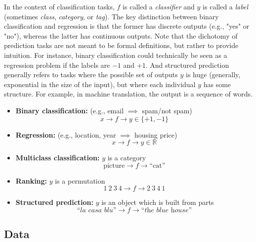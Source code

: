In the context of classification tasks, $f$ is called a \textit{classifier} and $y$ is called a \textit{label} (sometimes \textit{class}, \textit{category}, or \textit{tag}). The key distinction between binary classification and regression is that the former has discrete outputs (e.g., "yes" or "no"), whereas the latter has continuous outputs.
Note that the dichotomy of prediction tasks are not meant to be formal definitions, but rather to provide intuition.
For instance, binary classification could technically be seen as a regression problem if the labels are $-1$ and $+1$. And structured prediction generally refers to tasks where the possible set of outputs $y$ is huge (generally, exponential in the size of the input), but where each individual $y$ has some structure. For example, in machine translation, the output is a sequence of words.

\begin{itemize}
    \item \textbf{Binary classification:} (e.g., email $\implies$ spam/not spam)
    \[
        x \longrightarrow \boxed{f} \longrightarrow y \in \{+1, -1\}
    \]

    \item \textbf{Regression:} (e.g., location, year $\implies$ housing price)
    \[
        x \longrightarrow \boxed{f} \longrightarrow y \in \mathbb{R}
    \]

    \item \textbf{Multiclass classification:} $y$ is a category
    \[
        \text{picture} \longrightarrow \boxed{f} \longrightarrow \text{``cat''}
    \]

    \item \textbf{Ranking:} $y$ is a permutation %
    \[
        \boxed{1}~\boxed{2}~\boxed{3}~\boxed{4} \longrightarrow \boxed{f} \longrightarrow 2~3~4~1
    \]

    \item \textbf{Structured prediction:} $y$ is an object which is built from parts
    \[
        \textit{``la casa blu''} \longrightarrow \boxed{f} \longrightarrow \textit{``the blue house''}
    \]
\end{itemize}



\subsection{Data} %
\label{sub:data}


